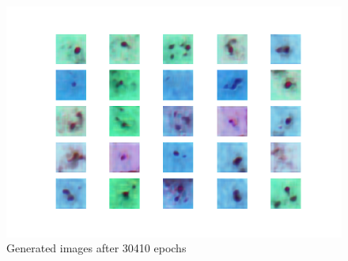 \begin{figure}[h]
\label{fig:gen30410}
\begin{center}
\includegraphics[scale=0.45]{./images/generation/alta_mnist_30410.png} \end{center}
\caption{Generated images after 30410 epochs}
\end{figure}



